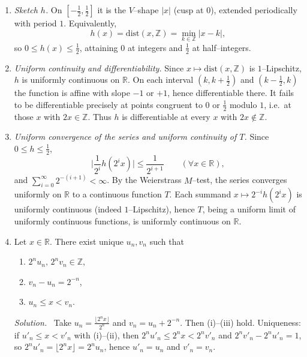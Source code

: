 \documentclass[11pt,a4paper]{article}
\newenvironment{solution}{\par\noindent\textit{Solution.}\ }{\par\vspace{0.5em}}
\begin{document}
\begin{enumerate}
	\renewcommand\labelenumi{(\alph{enumi})}
	
	\item \textit{Sketch $h$.} On $[-\tfrac12,\tfrac12]$ it is the $V$--shape $|x|$ (cusp at $0$), extended periodically
	with period $1$. Equivalently,
	\[
	h(x)=\mathrm{dist}(x,\mathbb{Z})=\min_{k\in\mathbb{Z}}|x-k|,
	\]
	so $0\le h(x)\le \tfrac12$, attaining $0$ at integers and $\tfrac12$ at half--integers.
	
	\item \textit{Uniform continuity and differentiability.} Since $x\mapsto \mathrm{dist}(x,\mathbb{Z})$ is $1$--Lipschitz,
	$h$ is uniformly continuous on $\mathbb{R}$. On each interval $(k,k+\tfrac12)$ and $(k-\tfrac12,k)$ the function is affine with
	slope $-1$ or $+1$, hence differentiable there. It fails to be differentiable precisely at points congruent to
	$0$ or $\tfrac12$ modulo $1$, i.e.\ at those $x$ with $2x\in\mathbb{Z}$. Thus $h$ is differentiable at every $x$ with $2x\notin\mathbb{Z}$.
	
	\item \textit{Uniform convergence of the series and uniform continuity of $T$.}
	Since $0\le h\le \tfrac12$,
	\[
	\Big|\frac1{2^i}h(2^i x)\Big|\le \frac{1}{2^{i+1}}\qquad(\forall x\in\mathbb{R}),
	\]
	and $\sum_{i=0}^\infty 2^{-(i+1)}<\infty$. By the Weierstrass $M$--test, the series converges uniformly on $\mathbb{R}$
	to a continuous function $T$. Each summand $x\mapsto 2^{-i}h(2^i x)$ is uniformly continuous (indeed $1$--Lipschitz),
	hence $T$, being a uniform limit of uniformly continuous functions, is uniformly continuous on $\mathbb{R}$.
	
	\item Let $x\in\mathbb{R}$. There exist unique $u_n,v_n$ such that
	\begin{enumerate}
		\renewcommand\labelenumii{(\roman{enumii})}
		\item $2^n u_n,\,2^n v_n\in\mathbb{Z}$,
		\item $v_n-u_n=2^{-n}$,
		\item $u_n\le x< v_n$.
	\end{enumerate}
	\begin{solution}
		Take $u_n=\frac{\lfloor 2^n x\rfloor}{2^n}$ and $v_n=u_n+2^{-n}$. Then (i)--(iii) hold. Uniqueness:
		if $u'_n\le x< v'_n$ with (i)--(ii), then $2^n u'_n\le 2^n x<2^n v'_n$ and $2^n v'_n-2^n u'_n=1$, so
		$2^n u'_n=\lfloor 2^n x\rfloor=2^n u_n$, hence $u'_n=u_n$ and $v'_n=v_n$.
	\end{solution}
	

\end{enumerate}
\end{document}
